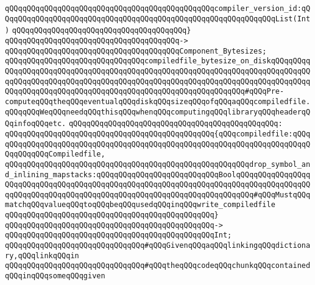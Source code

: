 \verb|qQQqqQQqqQQqqQQqqQQqqQQqqQQqqQQqqQQqqQQqqQQqqQQqcompiler_version_id:qQQqqQQqqQQqqQQqqQQqqQQqqQQqqQQqqQQqqQQqqQQqqQQqqQQqqQQqqQQqqQQqList(Int)|\newline
\verb|qQQqqQQqqQQqqQQqqQQqqQQqqQQqqQQqqQQqqQQq}|\newline
\verb|qQQqqQQqqQQqqQQqqQQqqQQqqQQqqQQqqQQqqQQq->|\newline
\verb|qQQqqQQqqQQqqQQqqQQqqQQqqQQqqQQqqQQqqQQqComponent_Bytesizes;|\newline
\newline
\newline
\verb|qQQqqQQqqQQqqQQqqQQqqQQqqQQqqQQqcompiledfile_bytesize_on_diskqQQqqQQqqQQqqQQqqQQqqQQqqQQqqQQqqQQqqQQqqQQqqQQqqQQqqQQqqQQqqQQqqQQqqQQqqQQqqQQqqQQqqQQqqQQqqQQqqQQqqQQqqQQqqQQqqQQqqQQqqQQqqQQqqQQqqQQqqQQqqQQqqQQqqQQqqQQqqQQqqQQqqQQqqQQqqQQqqQQqqQQqqQQqqQQqqQQqqQQqqQQq#qQQqPre-computeqQQqtheqQQqeventualqQQqdiskqQQqsizeqQQqofqQQqaqQQqcompiledfile.qQQqqQQqWeqQQqneedqQQqthisqQQqwhenqQQqcomputingqQQqlibraryqQQqheaderqQQqinfoqQQqetc.|\newline
\verb|qQQqqQQqqQQqqQQqqQQqqQQqqQQqqQQqqQQqqQQqqQQqqQQq:|\newline
\verb|qQQqqQQqqQQqqQQqqQQqqQQqqQQqqQQqqQQqqQQqqQQqqQQq{qQQqcompiledfile:qQQqqQQqqQQqqQQqqQQqqQQqqQQqqQQqqQQqqQQqqQQqqQQqqQQqqQQqqQQqqQQqqQQqqQQqqQQqqQQqqQQqCompiledfile,|\newline
\verb|qQQqqQQqqQQqqQQqqQQqqQQqqQQqqQQqqQQqqQQqqQQqqQQqqQQqqQQqdrop_symbol_and_inlining_mapstacks:qQQqqQQqqQQqqQQqqQQqqQQqqQQqBoolqQQqqQQqqQQqqQQqqQQqqQQqqQQqqQQqqQQqqQQqqQQqqQQqqQQqqQQqqQQqqQQqqQQqqQQqqQQqqQQqqQQqqQQqqQQqqQQqqQQqqQQqqQQqqQQqqQQqqQQqqQQqqQQqqQQqqQQqqQQqqQQq#qQQqMustqQQqmatchqQQqvalueqQQqtoqQQqbeqQQqusedqQQqinqQQqwrite_compiledfile|\newline
\verb|qQQqqQQqqQQqqQQqqQQqqQQqqQQqqQQqqQQqqQQqqQQqqQQq}|\newline
\verb|qQQqqQQqqQQqqQQqqQQqqQQqqQQqqQQqqQQqqQQqqQQqqQQq->|\newline
\verb|qQQqqQQqqQQqqQQqqQQqqQQqqQQqqQQqqQQqqQQqqQQqqQQqInt;|\newline
\newline
\newline
\newline
\newline
\verb|qQQqqQQqqQQqqQQqqQQqqQQqqQQqqQQq#qQQqGivenqQQqaqQQqlinkingqQQqdictionary,qQQqlinkqQQqin|\newline
\verb|qQQqqQQqqQQqqQQqqQQqqQQqqQQqqQQq#qQQqtheqQQqcodeqQQqchunkqQQqcontainedqQQqinqQQqsomeqQQqgiven|\newline
